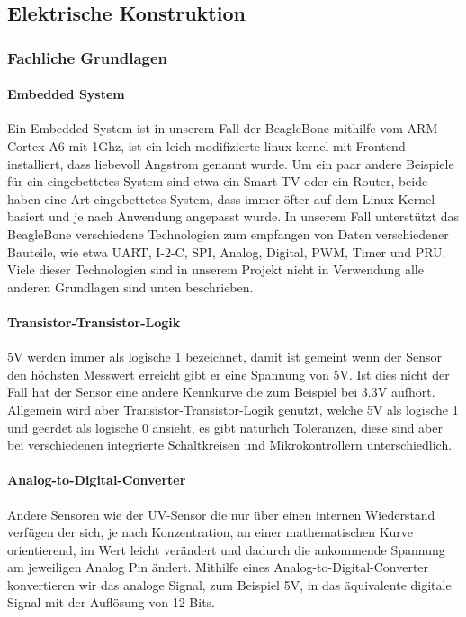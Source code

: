 \subsection{Elektrische Konstruktion}



\subsubsection{Fachliche Grundlagen}
\paragraph{Embedded System}
Ein Embedded System ist in unserem Fall der BeagleBone mithilfe vom ARM Cortex-A6 mit 1Ghz, ist ein leich modifizierte linux kernel mit Frontend installiert, dass liebevoll Angstrom genannt wurde. Um ein paar andere Beispiele für ein eingebettetes System sind etwa ein Smart TV oder ein Router, beide haben eine Art eingebettetes System, dass immer öfter auf dem Linux Kernel basiert und je nach Anwendung angepasst wurde. In unserem Fall unterstützt das BeagleBone verschiedene Technologien zum empfangen von Daten verschiedener Bauteile, wie etwa UART, I-2-C, SPI, Analog, Digital, PWM, Timer und PRU. Viele dieser Technologien sind in unserem Projekt nicht in Verwendung alle anderen Grundlagen sind unten beschrieben.

\paragraph{Transistor-Transistor-Logik}
5V werden immer als logische 1 bezeichnet, damit ist gemeint wenn der Sensor den höchsten Messwert erreicht gibt er eine Spannung von 5V. Ist dies nicht der Fall hat der Sensor eine andere Kennkurve die zum Beispiel bei 3.3V aufhört. Allgemein wird aber Transistor-Transistor-Logik genutzt, welche 5V als logische 1 und geerdet als logische 0 ansieht, es gibt natürlich Toleranzen, diese sind aber bei verschiedenen integrierte Schaltkreisen und Mikrokontrollern unterschiedlich.

\paragraph{Analog-to-Digital-Converter}
Andere Sensoren wie der UV-Sensor die nur über einen internen Wiederstand verfügen der sich, je nach Konzentration, an einer mathematischen Kurve orientierend, im Wert leicht verändert und dadurch die ankommende Spannung am jeweiligen Analog Pin ändert. Mithilfe eines Analog-to-Digital-Converter konvertieren wir das analoge Signal, zum Beispiel 5V, in das äquivalente digitale Signal mit der Auflösung von 12 Bits. \\

